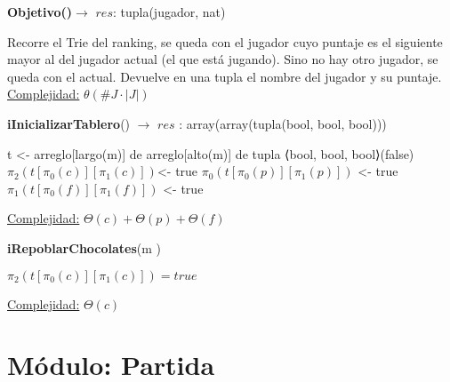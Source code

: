 \documentclass[10pt,a4paper]{article}
\begin{document}
\begin{Algoritmos}
    \begin{algorithm}[H]{\textbf{Objetivo()}}$\to$ $res$: tupla(jugador, nat)
        \begin{algorithmic}
            \State Recorre el Trie del ranking, se queda con el jugador cuyo puntaje es el siguiente mayor al del jugador actual (el que está jugando). Sino no hay otro jugador, se queda con el actual.
            Devuelve en una tupla el nombre del jugador y su puntaje.
            \State \underline{Complejidad:} $\theta(\#J \cdot |J|)$
        \end{algorithmic}
    \end{algorithm}

    \begin{algorithm}[H]{\textbf{iInicializarTablero}() $\to$ $res$ : array(array(tupla(bool, bool, bool)))}
        \begin{algorithmic}
        
            \State t <- arreglo[largo(m)] de arreglo[alto(m)] de tupla ⟨bool, bool, bool⟩(false)
		     
			    \State $\pi_2(t[\pi_0(c)][\pi_1(c)])$<- true
		    \EndFor
		     
			    \State $\pi_0(t[\pi_0(p)][\pi_1(p)])$ <- true
	        \EndFor
		     
			    \State $\pi_1(t[\pi_0(f)][\pi_1(f)])$ <- true
		    \EndFor
            
        
            \Statex \underline{Complejidad:} $\Theta(c) + \Theta(p) + \Theta(f)$
        \end{algorithmic}
    \end{algorithm}

    \begin{algorithm}[H]{\textbf{iRepoblarChocolates}(m )}
        \begin{algorithmic}
                \State $\pi_2(t[\pi_0(c)][\pi_1(c)]) = true$
            \EndFor
            
        
            \Statex \underline{Complejidad:} $\Theta(c)$
        \end{algorithmic}
    \end{algorithm}
    
\end{Algoritmos}

\section{Módulo: Partida}
\end{document}
